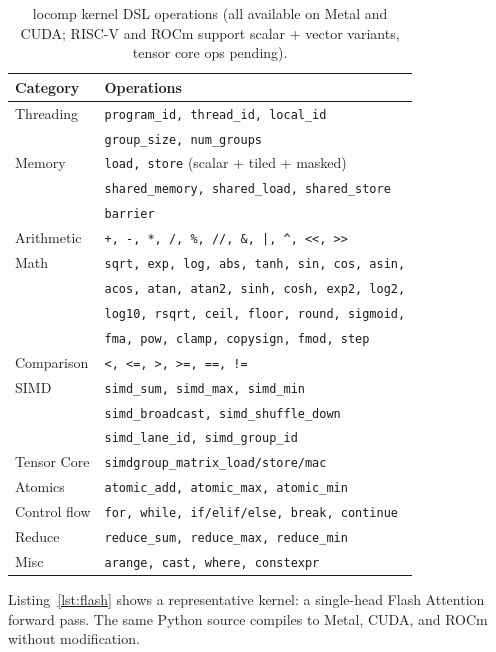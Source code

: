 \documentclass[10pt,twocolumn]{article}
\begin{document}
\begin{table}[h]
\centering
\footnotesize
\begin{tabular}{@{}ll@{}}
\toprule
\textbf{Category} & \textbf{Operations} \\
\midrule
Threading & \texttt{program\_id, thread\_id, local\_id} \\
           & \texttt{group\_size, num\_groups} \\
Memory & \texttt{load, store} (scalar + tiled + masked) \\
       & \texttt{shared\_memory, shared\_load, shared\_store} \\
       & \texttt{barrier} \\
Arithmetic & \texttt{+, -, *, /, \%, //, \&, |, \^{}, <<, >>} \\
Math & \texttt{sqrt, exp, log, abs, tanh, sin, cos, asin,} \\
     & \texttt{acos, atan, atan2, sinh, cosh, exp2, log2,} \\
     & \texttt{log10, rsqrt, ceil, floor, round, sigmoid,} \\
     & \texttt{fma, pow, clamp, copysign, fmod, step} \\
Comparison & \texttt{<, <=, >, >=, ==, !=} \\
SIMD & \texttt{simd\_sum, simd\_max, simd\_min} \\
     & \texttt{simd\_broadcast, simd\_shuffle\_down} \\
     & \texttt{simd\_lane\_id, simd\_group\_id} \\
Tensor Core & \texttt{simdgroup\_matrix\_load/store/mac} \\
Atomics & \texttt{atomic\_add, atomic\_max, atomic\_min} \\
Control flow & \texttt{for, while, if/elif/else, break, continue} \\
Reduce & \texttt{reduce\_sum, reduce\_max, reduce\_min} \\
Misc & \texttt{arange, cast, where, constexpr} \\
\bottomrule
\end{tabular}
\caption{locomp kernel DSL operations (all available on Metal and CUDA;
RISC-V and ROCm support scalar + vector variants, tensor core ops pending).}
\label{tab:dsl}
\end{table}

Listing~\ref{lst:flash} shows a representative kernel: a single-head
Flash Attention forward pass. The same Python source compiles to Metal,
CUDA, and ROCm without modification.
\end{document}
